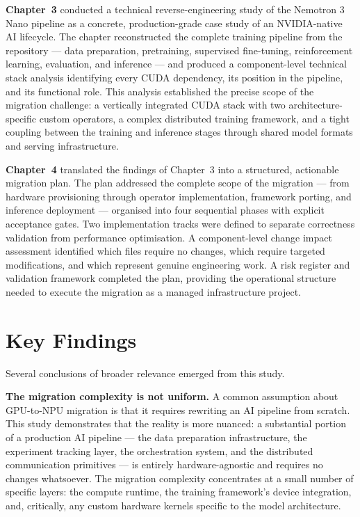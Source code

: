 \textbf{Chapter~3} conducted a technical reverse-engineering study
of the Nemotron 3 Nano pipeline as a concrete, production-grade
case study of an NVIDIA-native AI lifecycle. The chapter
reconstructed the complete training pipeline from the repository
— data preparation, pretraining, supervised fine-tuning,
reinforcement learning, evaluation, and inference — and produced
a component-level technical stack analysis identifying every
CUDA dependency, its position in the pipeline, and its functional
role. This analysis established the precise scope of the migration
challenge: a vertically integrated CUDA stack with two
architecture-specific custom operators, a complex distributed
training framework, and a tight coupling between the training
and inference stages through shared model formats and serving
infrastructure.

\textbf{Chapter~4} translated the findings of Chapter~3 into a
structured, actionable migration plan. The plan addressed the
complete scope of the migration — from hardware provisioning
through operator implementation, framework porting, and inference
deployment — organised into four sequential phases with explicit
acceptance gates. Two implementation tracks were defined to
separate correctness validation from performance optimisation.
A component-level change impact assessment identified which
files require no changes, which require targeted modifications,
and which represent genuine engineering work. A risk register
and validation framework completed the plan, providing the
operational structure needed to execute the migration as a
managed infrastructure project.

\section*{Key Findings}

Several conclusions of broader relevance emerged from this study.

\textbf{The migration complexity is not uniform.} A common
assumption about GPU-to-NPU migration is that it requires
rewriting an AI pipeline from scratch. This study demonstrates
that the reality is more nuanced: a substantial portion of a
production AI pipeline — the data preparation infrastructure,
the experiment tracking layer, the orchestration system,
and the distributed communication primitives — is entirely
hardware-agnostic and requires no changes whatsoever. The
migration complexity concentrates at a small number of specific
layers: the compute runtime, the training framework's
device integration, and, critically, any custom hardware
kernels specific to the model architecture.


